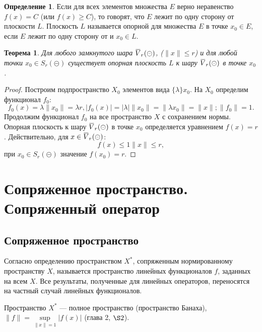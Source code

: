 \documentclass[12pt,a4paper,titlepage,oneside]{book}
\newcommand{\overbar}[1]{\mkern 1.5mu\overline{\mkern-1.5mu#1\mkern-1.5mu}\mkern 1.5mu}
\theoremstyle{definition}
\newtheorem*{definition}{Определение}
\theoremstyle{plain}
\newtheorem*{theorem}{Теорема}
\theoremstyle{remark}
\theoremstyle{remark}
\theoremstyle{remark}
\theoremstyle{remark}
\theoremstyle{plain}
\theoremstyle{plain}
\begin{document}
\begin {definition}
Если для всех элементов множества $E$ верно неравенство $f(x)=C$ (или $f(x) \geqslant C$), то говорят, что $E$ лежит по одну сторону от плоскости $L$. Плоскость $L$ называется опорной для множества $E$ в точке $x_0 \in E$, если $E$ лежит по одну сторону от и $x_0 \in L$.
\end {definition}

\begin{theorem}
Для любого замкнутого шара $\overbar{V}_r(\circleddash)$, ($\lVert x \rVert \leqslant r$) и для любой точки $x_0 \in S_r(\circleddash)$ существует опорная плоскость $L$ к шару $\overbar{V}_r(\circleddash)$ в точке $x_0$.
\end{theorem}

\begin{proof}
Построим подпространство $X_0$ элементов вида $\{ \lambda \}x_0$. На $X_0$ определим функционал $f_0$:
\begin{equation*}
f_0(x)=\lambda \lVert x_0 \rVert = \lambda r, |f_0(x)|=|\lambda|\lVert x_0 \rVert=\lVert \lambda x_0 \rVert=\lVert x \rVert; \lVert f_0 \rVert=1.
\end{equation*}
Продолжим функционал $f_0$ на все пространство $X$ с сохранением нормы. Опорная плоскость к шару $\overbar{V}_r(\circleddash)$ в точке $x_0$ определяется уравнением $f(x)=r$. Действительно, для $x \in \overbar{V}_r(\circleddash)$:
\begin{equation*}
f(x)\leqslant 1 \lVert x \rVert \leqslant r,
\end{equation*}
при $x_0 \in S_r(\circleddash)$ значение $f(x_0)=r$.
\qedhere
\end{proof}

\chapter{Сопряженное пространство. Сопряженный оператор}

\section{Сопряженное пространство}

Согласно определению пространством $X^*$, сопряженным нормированному пространству $X$, называется пространство линейных функционалов $f$, заданных на всем $X$. Все результаты, полученные для линейных операторов, переносятся на частный случай линейных функционалов.

Пространство $X^*$ --- полное пространство (пространство Банаха), $\lVert f\rVert = \sup\limits_{\lVert x\rVert = 1}\lvert f(x)\rvert$ (глава 2, $\S 2$).
\end{document}
